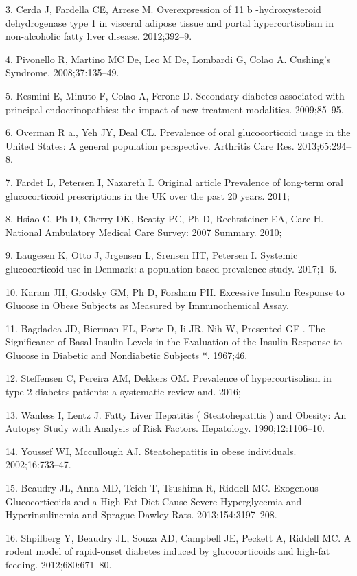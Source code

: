 \documentclass[11pt]{article} %
\begin{document}
3. Cerda J, Fardella CE, Arrese M. Overexpression of 11 b
-hydroxysteroid dehydrogenase type 1 in visceral adipose tissue and
portal hypercortisolism in non-alcoholic fatty liver disease.
2012;392--9.

4. Pivonello R, Martino MC De, Leo M De, Lombardi G, Colao A. Cushing's
Syndrome. 2008;37:135--49.

5. Resmini E, Minuto F, Colao A, Ferone D. Secondary diabetes
associated with principal endocrinopathies: the impact of new treatment
modalities. 2009;85--95.

6. Overman R a., Yeh JY, Deal CL. Prevalence of oral glucocorticoid
usage in the United States: A general population perspective. Arthritis
Care Res. 2013;65:294--8.

7. Fardet L, Petersen I, Nazareth I. Original article Prevalence of
long-term oral glucocorticoid prescriptions in the UK over the past 20
years. 2011;

8. Hsiao C, Ph D, Cherry DK, Beatty PC, Ph D, Rechtsteiner EA, Care H.
National Ambulatory Medical Care Survey: 2007 Summary. 2010;

9. Laugesen K, Otto J, Jrgensen L, Srensen HT, Petersen I. Systemic
glucocorticoid use in Denmark: a population-based prevalence study.
2017;1--6.

10. Karam JH, Grodsky GM, Ph D, Forsham PH. Excessive Insulin Response
to Glucose in Obese Subjects as Measured by Immunochemical Assay.

11. Bagdadea JD, Bierman EL, Porte D, Ii JR, Nih W, Presented GF-. The
Significance of Basal Insulin Levels in the Evaluation of the Insulin
Response to Glucose in Diabetic and Nondiabetic Subjects *. 1967;46.

12. Steffensen C, Pereira AM, Dekkers OM. Prevalence of hypercortisolism
in type 2 diabetes patients: a systematic review and. 2016;

13. Wanless I, Lentz J. Fatty Liver Hepatitis ( Steatohepatitis ) and
Obesity: An Autopsy Study with Analysis of Risk Factors. Hepatology.
1990;12:1106--10.

14. Youssef WI, Mccullough AJ. Steatohepatitis in obese individuals.
2002;16:733--47.

15. Beaudry JL, Anna MD, Teich T, Tsushima R, Riddell MC. Exogenous
Glucocorticoids and a High-Fat Diet Cause Severe Hyperglycemia and
Hyperinsulinemia and Sprague-Dawley Rats. 2013;154:3197--208.

16. Shpilberg Y, Beaudry JL, Souza AD, Campbell JE, Peckett A, Riddell
MC. A rodent model of rapid-onset diabetes induced by glucocorticoids
and high-fat feeding. 2012;680:671--80.
\end{document}
